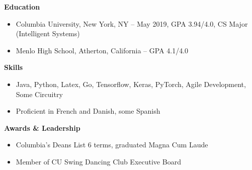 \documentclass{article}
\begin{document}

\noindent
{\large\textbf{Education}}
\begin{itemize}[noitemsep]
    \item Columbia University, New York, NY -- May 2019, GPA 3.94/4.0, CS Major (Intelligent Systems)
    \item Menlo High School, Atherton, California -- GPA 4.1/4.0
\end{itemize}

\noindent
{\large\textbf{Skills}}
\begin{itemize}[noitemsep]
    \item Java, Python, Latex, Go, Tensorflow, Keras, PyTorch, Agile Development, Some Circuitry
    \item Proficient in French and Danish, some Spanish
\end{itemize}
\noindent
{\large\textbf{Awards \& Leadership}}
\begin{itemize}[noitemsep]
    \item Columbia's Deans List 6 terms, graduated Magna Cum Laude
    \item Member of CU Swing Dancing Club Executive Board

\end{itemize}
\end{document}
